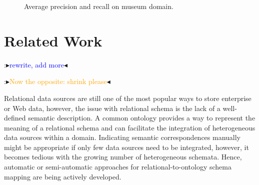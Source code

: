\documentclass[letterpaper]{article} %
\newcommand{\authornote}[3]{
  {\fbox{\sc 
  #1}:$\blacktriangleright$\textcolor{#2}{\small{#3}}$\blacktriangleleft$}%
}
\newcommand{\ddg}[1]{\authornote{DDG}{blue}{#1}}
\newcommand{\npr}[1]{\authornote{NPR}{orange}{#1}}
\begin{document}
\begin{figure*}[ht]
\begin{minipage}[b]{.5\linewidth}
\label{fig:bagsize}
\end{minipage}
\caption{Average precision and recall on museum domain.}\label{fig:bagging}
\end{figure*}

\section{Related Work \label{SEC:pw}}
\ddg{rewrite, add more}
\npr{Now the opposite: shrink please}

Relational data sources are still one of the most popular ways to store enterprise or Web data, however, the issue with relational schema is the lack of a well-defined semantic description.
A common ontology provides a way to represent the meaning of a relational schema and can facilitate the integration of heterogeneous data sources within a domain.
Indicating semantic correspondences manually might be appropriate if only few data sources need to be integrated, however, it becomes tedious with the growing number of heterogeneous schemata.
Hence, automatic or semi-automatic approaches for relational-to-ontology schema mapping are being actively developed.
\end{document}
